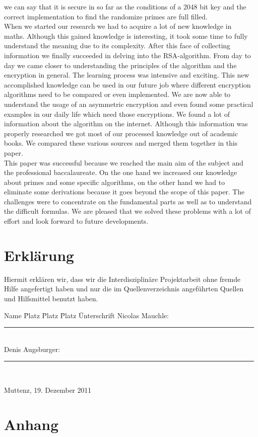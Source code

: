 we can say that it is secure in so far as the conditions of a 2048 bit key and the correct implementation to find the randomize primes are full filled. \\
When we started our research we had to acquire a lot of new knowledge in maths. Although this gained knowledge is interesting, it took some time to fully understand the meaning due to its complexity. After this face of collecting information we finally succeeded in delving into the RSA-algorithm. %
From day to day we came closer to understanding the principles of the algorithm and the encryption in general. The learning process was intensive and exciting. This new accomplished knowledge can be used in our future job where different encryption algorithms need to be compared or even implemented. We are now able to understand the usage of an asymmetric encryption and even found some practical examples in our daily life which need those encryptions.  
We found a lot of information about the algorithm on the internet. Although this information was properly researched we got most of our processed knowledge out of academic books. We compared these various sources and merged them together in this paper.\\
This paper was successful because we reached the main aim of the subject and the professional baccalaureate. On the one hand we increased our knowledge about primes and some specific algorithms, on the other hand we had to eliminate some derivations  %
because it goes beyond the scope of this paper. The challenges were to concentrate on the fundamental parts as well as to understand the difficult formulas. We are pleased that we solved these problems with a lot of effort and look forward to future developments. 
\newpage
\section{Erklärung}
Hiermit erklären wir, dass wir die Interdisziplinäre Projektarbeit ohne fremde Hilfe angefertigt haben und nur die im Quellenverzeichnis angeführten Quellen und Hilfsmittel benutzt haben.\\
  \begin{tabbing}
    Name \= Platz \= Platz \= Platz \=  Unterschrift \kill 
    Nicolas Mauchle:   \> \> \> \>   \rule{50mm}{1pt} \\[2ex]
    Denis Augsburger:   \> \> \> \>  \rule{50mm}{1pt} \\
  \end{tabbing}
Muttenz, 19. Dezember 2011
\newpage
\section{Anhang}
\listoffigures
\listoftables
%

